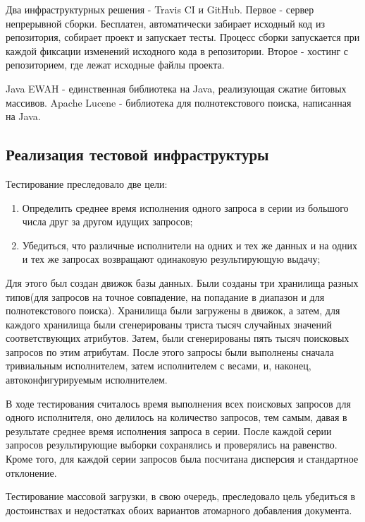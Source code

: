\documentclass{matmex-diploma}
\begin{document}
\begin{enumerate}
        Два инфраструктурных решения - Travis CI и GitHub. Первое - сервер непрерывной сборки. Бесплатен, автоматически забирает исходный код из репозитория, собирает проект и запускает тесты. Процесс сборки запускается при каждой фиксации изменений исходного кода в репозитории. Второе - хостинг с репозиторием, где лежат исходные файлы проекта. 
        
        Java EWAH - единственная библиотека на Java, реализующая сжатие битовых массивов. Apache Lucene - библиотека для полнотекстового поиска, написанная на Java.
        \end{enumerate}
    \subsection{Реализация тестовой инфраструктуры}
        Тестирование преследовало две цели:
            \begin{enumerate}
                \item Определить среднее время исполнения одного запроса в серии из большого числа друг за другом идущих запросов;
                \item Убедиться, что различные исполнители на одних и тех же данных и на одних и тех же запросах возвращают одинаковую результирующую выдачу;
            \end{enumerate}
            
        Для этого был создан движок базы данных. Были созданы три хранилища разных типов(для запросов на точное совпадение, на попадание в диапазон и для полнотекстового поиска). Хранилища были загружены в движок, а затем, для каждого хранилища были сгенерированы триста тысяч случайных значений соответствующих атрибутов. Затем, были сгенерированы пять тысяч поисковых запросов по этим атрибутам. После этого запросы были выполнены сначала тривиальным исполнителем, затем исполнителем с весами, и, наконец, автоконфигурируемым исполнителем. 
            
        В ходе тестирования считалось время выполнения всех поисковых запросов для одного исполнителя, оно делилось на количество запросов, тем самым, давая в результате среднее время исполнения запроса в серии. После каждой серии запросов результирующие выборки сохранялись и проверялись на равенство. Кроме того, для каждой серии запросов была посчитана дисперсия и стандартное отклонение.
        
        Тестирование массовой загрузки, в свою очередь, преследовало цель убедиться в достоинствах и недостатках обоих вариантов атомарного добавления документа.
        
\end{document}
